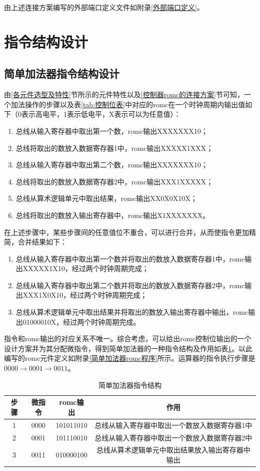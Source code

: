 \documentclass[a4paper]{ctexart}
\begin{document}
\begin{spacing}{1.3}
	由上述连接方案编写的外部端口定义文件如附录\ref{外部端口定义}。

	\section{指令结构设计}
	\subsection{简单加法器指令结构设计}\label{简单加法器指令结构}
	由\ref{各元件选型及特性}节所示的元件特性以及\ref{控制器romc的连接方案}节可知，一个加法操作的步骤以及表\ref{tab:控制位表}中对应的romc在一个时钟周期内输出值如下（0表示高电平，1表示低电平，X表示可以为任意值）：
	\begin{enumerate}[label=\arabic*、]
		\item 总线从输入寄存器中取出第一个数，romc输出XXXXXXX10；
		\item 总线将取出的数放入数据寄存器1中，romc输出XXXXX1XXX；
		\item 总线从输入寄存器中取出第二个数，romc输出XXXXXXX10；
		\item 总线将取出的数放入数据寄存器2中，romc输出XXX1XXXXX；
		\item 总线从算术逻辑单元中取出结果，romc输出XX0X0X10X；
		\item 总线将取出的数放入输出寄存器中，romc输出X1XXXXXXX。
	\end{enumerate}

	在上述步骤中，某些步骤间的任意值位不重合，可以进行合并，从而使指令更加精简，合并结果如下：
	\begin{enumerate}[label=\arabic*、]
		\item 总线从输入寄存器中取出第一个数并将取出的数放入数据寄存器1中，romc输出XXXXX1X10，经过两个时钟周期完成；
		\item 总线从输入寄存器中取出第二个数并将取出的数放入数据寄存器2中，romc输出XXX1X0X10，经过两个时钟周期完成；
		\item 总线从算术逻辑单元中取出结果并将取出的数放入输出寄存器中输出，romc输出01000010X，经过两个时钟周期完成。
	\end{enumerate}

	指令和romc输出的对应关系不唯一。综合考虑，可以给出romc控制位输出的一个设计方案并为其分配微指令，得到简单加法器的一种指令结构及作用如表\ref{tab:简单加法器指令结构}。以此编写的romc元件定义如附录\ref{简单加法器romc程序}所示。运算器的指令执行步骤是$0000\rightarrow 0001\rightarrow 0011$。
	\begin{table}[htbp]
		\centering
		\caption{简单加法器指令结构}\label{tab:简单加法器指令结构}
		\begin{tabular}{|c|c|c|c|}
			\hline
			步骤   & 微指令 & romc输出 & 作用\\
			\hline
			1 & 0000  & 101011010 & 总线从输入寄存器中取出一个数放入数据寄存器1中\\
			\hline
			2 & 0001  & 101110010 & 总线从输入寄存器中取出一个数放入数据寄存器2中\\
			\hline
			3 & 0011  & 010000100 & 总线从算术逻辑单元中取出结果放入输出寄存器中输出\\
			\hline
		\end{tabular}
	\end{table}



\end{spacing}
\end{document}

